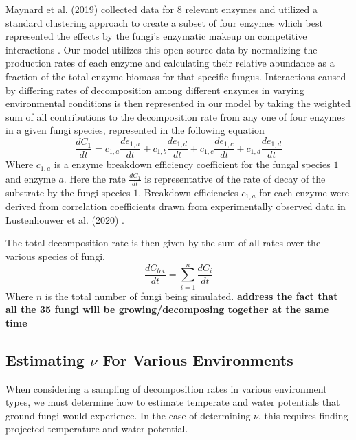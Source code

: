 \documentclass[12pt]{article}
\begin{document}
\begin{multicols}{2}
Maynard et al. (2019) collected data for 8 relevant enzymes and utilized a standard clustering approach to create a subset of four enzymes which best represented the effects by the fungi's enzymatic makeup on competitive interactions \cite{Maynard2019}. Our model utilizes this open-source data by normalizing the production rates of each enzyme and calculating their relative abundance as a fraction of the total enzyme biomass for that specific fungus. Interactions caused by differing rates of decomposition among different enzymes in varying environmental conditions is then represented in our model by taking the weighted sum of all contributions to the decomposition rate from any one of four enzymes in a given fungi species, represented in the following equation
\begin{equation} \label{eq}
\frac{dC_{1}}{dt} = c_{1,a}\frac{de_{1,a}}{dt} + c_{1,b}\frac{de_{1,d}}{dt} + c_{1,c}\frac{de_{1,c}}{dt} + c_{1,d}\frac{de_{1,d}}{dt}
\end{equation}
Where $c_{1,a}$ is a enzyme breakdown efficiency coefficient for the fungal species $1$ and enzyme $a$. Here the rate $\frac{dC_{1}}{dt}$ is representative of the rate of decay of the substrate by the fungi species $1$. Breakdown efficiencies $c_{1,a}$ for each enzyme were derived from correlation coefficients drawn from experimentally observed data in Lustenhouwer et al. (2020) \cite{Lustenhouwer2020}. 

The total decomposition rate is then given by the sum of all rates over the various species of fungi.
\begin{equation} \label{eq}
\frac{dC_{tot}}{dt} = \sum_{i=1}^{n}\frac{dC_{i}}{dt}
\end{equation}
Where $n$ is the total number of fungi being simulated. \textbf{address the fact that all the 35 fungi will be growing/decomposing together at the same time}

\subsection{Estimating $\nu$ For Various Environments}

When considering a sampling of decomposition rates in various environment types, we must determine how to estimate temperate and water potentials that ground fungi would experience. In the case of determining $\nu$, this requires finding projected temperature and water potential.


\end{multicols}
\end{document}
